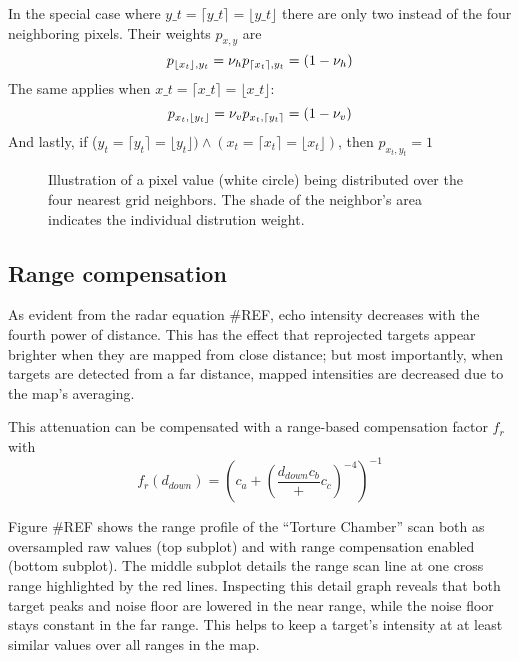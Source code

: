 In the special case where $y\_t = \lceil y\_t \rceil = \lfloor y\_t\rfloor$ there are only two instead of the four neighboring pixels. Their weights \(p_{x,y}\) are \[
p_{\lfloor x_t \rfloor, y_t} = \nu_h\\
p_{\lceil x_t \rceil, y_t} = (1 - \nu_h)
\] The same applies when $x\_t = \lceil x\_t \rceil = \lfloor x\_t\rfloor$: \[
p_{x_t, \lfloor y_t \rfloor} = \nu_v\\
p_{x_t, \lceil y_t \rceil} = (1 - \nu_v)
\] And lastly, if
(\(y_t = \lceil y_t \rceil = \lfloor y_t \rfloor ) \land (x_t = \lceil x_t \rceil = \lfloor x_t \rfloor )\),
then \(p_{x_t, y_t} = 1\)

\begin{figure}[htbp]
    \centering
    \label{fig:Sample_splitting}
    \def\svgwidth{10cm}
    
    \caption{Illustration of a pixel value (white circle) being distributed over the four nearest grid neighbors. The shade of the neighbor's area indicates the individual distrution weight.}
\end{figure}

\subsection{Range compensation}\label{range-compensation}

As evident from the radar equation \#REF, echo intensity decreases with
the fourth power of distance. This has the effect that reprojected
targets appear brighter when they are mapped from close distance; but
most importantly, when targets are detected from a far distance, mapped
intensities are decreased due to the map's averaging.

This attenuation can be compensated with a range-based compensation
factor \(f_r\) with \[f_r(d_{down}) = {
\left(
c_a + (
\frac{{d_{down}}{c_b}}
+ c_c)^{-4}
\right) ^ {-1}
}\]



Figure \#REF shows the range profile of the ``Torture Chamber'' scan
both as oversampled raw values (top subplot) and with range compensation
enabled (bottom subplot). The middle subplot details the range scan line
at one cross range highlighted by the red lines. Inspecting this detail
graph reveals that both target peaks and noise floor are lowered in the
near range, while the noise floor stays constant in the far range. This
helps to keep a target's intensity at at least similar values over all
ranges in the map.

